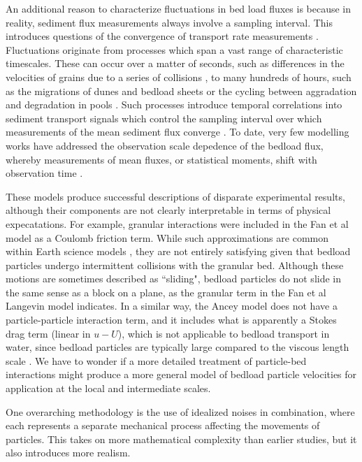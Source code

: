 An additional reason to characterize fluctuations in bed load fluxes is because in reality, sediment flux measurements always involve a sampling interval.
This introduces questions of the convergence of transport rate measurements \citep{Dhont2018,Ancey2020}.
Fluctuations originate from processes which span a vast range of characteristic timescales.
These can occur over a matter of seconds, such as differences in the velocities of grains due to a series of collisions \citep{Benavides2021}, to many hundreds of hours, such as the migrations of dunes and bedload sheets \citep{Hammamori1962,Hoey1992,Guala2014} or the cycling between aggradation and degradation in pools \citep{Dhont2018}.
Such processes introduce temporal correlations into sediment transport signals which control the sampling interval over which measurements of the mean sediment flux converge \citep{Saletti2015,Singh2009,Singh2012}.
To date, very few modelling works have addressed the observation scale depedence of the bedload flux, whereby measurements of mean fluxes, or statistical moments, shift with observation time \citep{Ancey2020}.


These models produce successful descriptions of disparate experimental results, although their components are not clearly interpretable in terms of physical expecatations. For example, granular interactions were included in the Fan et al model as a Coulomb friction term. While such approximations are common within Earth science models \citep{Kirkby1971}, they are not entirely satisfying given that bedload particles undergo intermittent collisions with the granular bed. Although these motions are sometimes described as ``sliding", bedload particles do not slide in the same sense as a block on a plane, as the granular term in the Fan et al Langevin model indicates.
In a similar way, the Ancey model does not have a particle-particle interaction term, and it includes what is apparently a Stokes drag term (linear in $u-U$), which is not applicable to bedload transport in water, since bedload particles are typically large compared to the viscous length scale \citep{Clift1978}.
We have to wonder if a more detailed treatment of particle-bed interactions might produce a more general model of bedload particle velocities for application at the local and intermediate scales.


One overarching methodology is the use of idealized noises in combination, where each represents a separate mechanical process affecting the movements of particles. This takes on more mathematical complexity than earlier studies, but it also introduces more realism.

